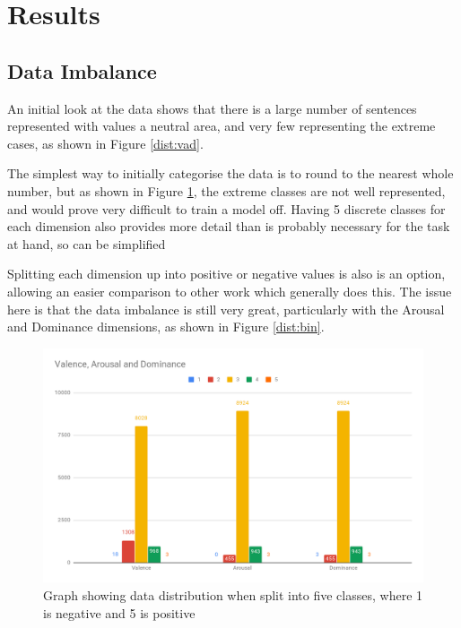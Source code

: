 \section{Results}
\subsection{Data Imbalance}
An initial look at the data shows that there is a large number of sentences represented with values a neutral area, and very few representing the extreme cases, as shown in Figure \ref{dist:vad}.

The simplest way to initially categorise the data is to round to the nearest whole number, but as shown in Figure \ref{dist:5cat}, the extreme classes are not well represented, and would prove very difficult to train a model off. Having 5 discrete classes for each dimension also provides more detail than is probably necessary for the task at hand, so can be simplified

Splitting each dimension up into positive or negative values is also is an option, allowing an easier comparison to other work which generally does this. The issue here is that the data imbalance is still very great, particularly with the Arousal and Dominance dimensions, as shown in Figure \ref{dist:bin}.

\begin{figure}[h]
\centering
\includegraphics[scale=0.3]{graphs/5catDist.png}
\caption{Graph showing data distribution when split into five classes, where 1 is negative and 5 is positive}
\label{dist:5cat}
\end{figure}

